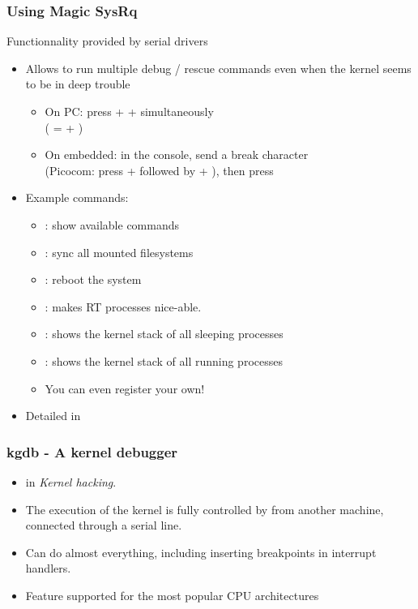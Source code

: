 \begin{frame}[fragile]
  \frametitle{Using Magic SysRq}
  Functionnality provided by serial drivers
  \begin{itemize}
  \item Allows to run multiple debug / rescue commands even when the
    kernel seems to be in deep trouble
    \begin{itemize}
    \item On PC: press \code{[Alt]} +  + 
	  simultaneously\\
          (\code{[SysRq]} = \code{[Alt]} + )
    \item On embedded: in the console, send a break character\\
      (Picocom: press \code{[Ctrl]} +  followed by \code{[Ctrl]}
      + \code{\ }), then press 
    \end{itemize}
  \item Example commands:
    \begin{itemize}
    \item {}: show available commands
    \item {}: sync all mounted filesystems
    \item {}: reboot the system
    \item {}: makes RT processes nice-able.
    \item {}: shows the kernel stack of all sleeping processes
    \item {}: shows the kernel stack of all running processes
    \item You can even register your own!
    \end{itemize}
  \item Detailed in 
  \end{itemize}
\end{frame}

\begin{frame}
  \frametitle{kgdb - A kernel debugger}
  \begin{itemize}
  \item {} in {\em Kernel hacking}.
  \item The execution of the kernel is fully controlled by 
    from another machine, connected through a serial line.
  \item Can do almost everything, including inserting breakpoints in
    interrupt handlers.
  \item Feature supported for the most popular CPU architectures
  \end{itemize}
\end{frame}

